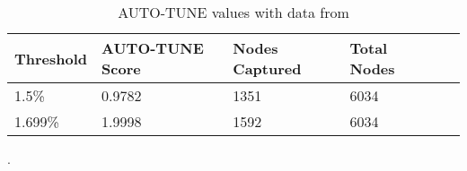 \documentclass[utf8]{FrontiersinHarvard} %
\begin{document}
\begin{table}[h!]
	\centering
	\begin{tabularx}{\textwidth}{|X|X|X|X|X|X|}
		\hline
		Threshold & AUTO-TUNE Score & Nodes Captured & Total Nodes \\
		\hline
		1.5\%     & 0.9782          & 1351           & 6034        \\
		1.699\%   & 1.9998          & 1592           & 6034        \\
		\hline
	\end{tabularx}
	\caption{AUTO-TUNE values with data from \cite{rhee_national_2019}}.
	\label{table:rhee}
\end{table}

\end{document}
